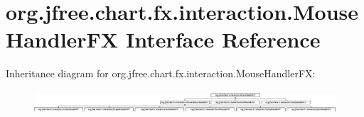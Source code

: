 \hypertarget{interfaceorg_1_1jfree_1_1chart_1_1fx_1_1interaction_1_1_mouse_handler_f_x}{}\section{org.\+jfree.\+chart.\+fx.\+interaction.\+Mouse\+Handler\+FX Interface Reference}
\label{interfaceorg_1_1jfree_1_1chart_1_1fx_1_1interaction_1_1_mouse_handler_f_x}
Inheritance diagram for org.\+jfree.\+chart.\+fx.\+interaction.\+Mouse\+Handler\+FX\+:\begin{figure}[H]
\begin{center}
\leavevmode
\includegraphics[height=0.848485cm]{interfaceorg_1_1jfree_1_1chart_1_1fx_1_1interaction_1_1_mouse_handler_f_x}
\end{center}
\end{figure}
